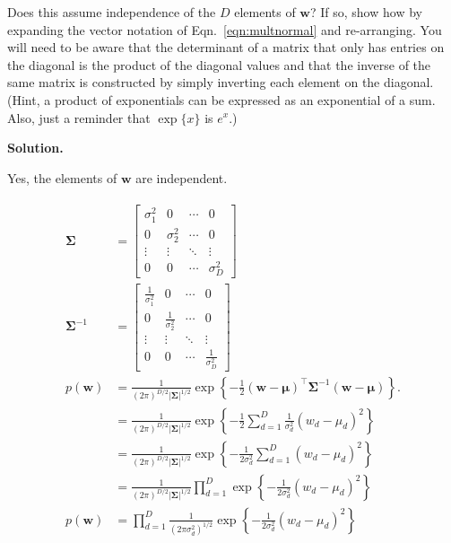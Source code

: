 \documentclass[10pt]{article}
\begin{document}
\begin{itemize}
Does this assume independence of the $D$ elements of $\mathbf{w}$?  If so, show how by expanding the vector notation of Eqn.~\ref{eqn:multnormal} and re-arranging.  You will need to be aware that the determinant of a matrix that only has entries on the diagonal is the product of the diagonal values and that the inverse of the same matrix is constructed by simply inverting each element on the diagonal.  (Hint, a product of exponentials can be expressed as an exponential of a sum.  Also, just a reminder that $\exp\{x\}$ is $e^x$.)

{\bf Solution.}

Yes, the elements of $\mathbf{w}$ are independent.

\begin{eqnarray*}
\begin{aligned}
\mathbf{\Sigma} &= 
\begin{bmatrix}
\sigma_1^2 & 0 & \cdots & 0 \\
0 & \sigma_2^2 & \cdots & 0 \\
\vdots & \vdots & \ddots & \vdots \\
0 & 0 & \cdots & \sigma_D^2
\end{bmatrix}
\\
\mathbf{\Sigma}^{-1} &= 
\begin{bmatrix}
\frac{1}{\sigma_1^2} & 0 & \cdots & 0 \\
0 & \frac{1}{\sigma_2^2} & \cdots & 0 \\
\vdots & \vdots & \ddots & \vdots \\
0 & 0 & \cdots & \frac{1}{\sigma_D^2}
\end{bmatrix}
\\
p(\mathbf{w}) &= \frac{1}{(2 \pi)^{D/2} | \mathbf{\Sigma} |^{1/2}} \exp \left\{ -\frac{1}{2} (\mathbf{w} - \boldsymbol{\mu})^\top \mathbf{\Sigma}^{-1} (\mathbf{w} - \boldsymbol{\mu}) \right\} . \label{eqn:multnormal}
\\
&= \frac{1}{(2 \pi)^{D/2} | \mathbf{\Sigma} |^{1/2}} \exp 
\left\{ 
-\frac{1}{2} 
\sum_{d=1}^D 
\frac{1}{\sigma^2_d} (w_d - \mu_d)^2
\right\} 
\\
&= \frac{1}{(2 \pi)^{D/2} | \mathbf{\Sigma} |^{1/2}} \exp 
\left\{ 
-\frac{1}{2\sigma^2_d}
\sum_{d=1}^D 
(w_d - \mu_d)^2
\right\} 
\\
&= \frac{1}{(2 \pi)^{D/2} | \mathbf{\Sigma} |^{1/2}} 
\prod_{d=1}^D
\exp 
\left\{ 
-\frac{1}{2\sigma^2_d} 
(w_d - \mu_d)^2
\right\} 
\\
p(\mathbf{w}) &= 
\prod_{d=1}^D
\frac{1}{(2 \pi \sigma^2_d)^{1/2}}
\exp 
\left\{ 
-\frac{1}{2\sigma^2_d} 
(w_d - \mu_d)^2
\right\} 
\end{aligned}
\end{eqnarray*}



\end{itemize}
\end{document}
